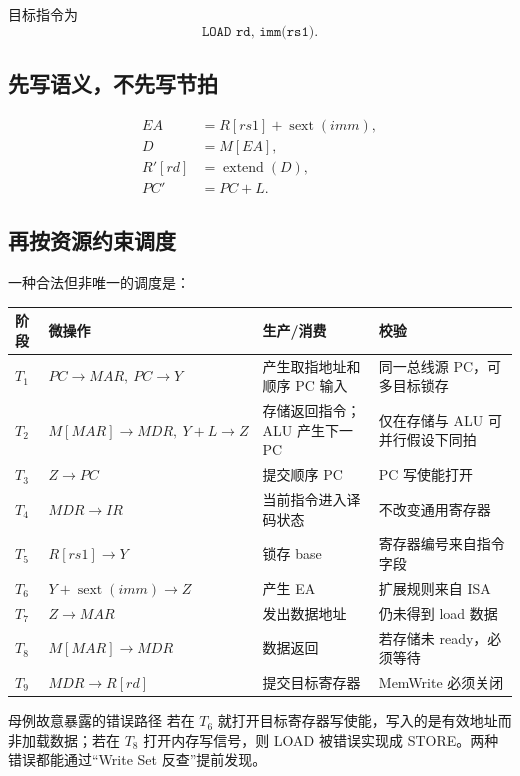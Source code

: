 \documentclass[UTF8,fontset=fandol,11pt,a4paper]{ctexart}
\newcommand{\code}[1]{\texttt{#1}}
\begin{document}
目标指令为
\[
\code{LOAD rd, imm(rs1)}.
\]

\subsection{先写语义，不先写节拍}
\begin{align*}
EA&=R[rs1]+\operatorname{sext}(imm),\\
D&=M[EA],\\
R'[rd]&=\operatorname{extend}(D),\\
PC'&=PC+L.
\end{align*}

\subsection{再按资源约束调度}

一种合法但非唯一的调度是：
\begin{center}
\small
\begin{tabularx}{\linewidth}{C{1.1cm}L{4.4cm}YY}
\toprule
阶段 & 微操作 & 生产/消费 & 校验 \\
\midrule
$T_1$ & $PC\to MAR,\ PC\to Y$ & 产生取指地址和顺序 PC 输入 & 同一总线源 PC，可多目标锁存 \\
$T_2$ & $M[MAR]\to MDR,\ Y+L\to Z$ & 存储返回指令；ALU 产生下一 PC & 仅在存储与 ALU 可并行假设下同拍 \\
$T_3$ & $Z\to PC$ & 提交顺序 PC & PC 写使能打开 \\
$T_4$ & $MDR\to IR$ & 当前指令进入译码状态 & 不改变通用寄存器 \\
$T_5$ & $R[rs1]\to Y$ & 锁存 base & 寄存器编号来自指令字段 \\
$T_6$ & $Y+\operatorname{sext}(imm)\to Z$ & 产生 EA & 扩展规则来自 ISA \\
$T_7$ & $Z\to MAR$ & 发出数据地址 & 仍未得到 load 数据 \\
$T_8$ & $M[MAR]\to MDR$ & 数据返回 & 若存储未 ready，必须等待 \\
$T_9$ & $MDR\to R[rd]$ & 提交目标寄存器 & MemWrite 必须关闭 \\
\bottomrule
\end{tabularx}
\end{center}

\begin{warnbox}{母例故意暴露的错误路径}
若在 $T_6$ 就打开目标寄存器写使能，写入的是有效地址而非加载数据；若在 $T_8$ 打开内存写信号，则 LOAD 被错误实现成 STORE。两种错误都能通过“Write Set 反查”提前发现。
\end{warnbox}
\end{document}

